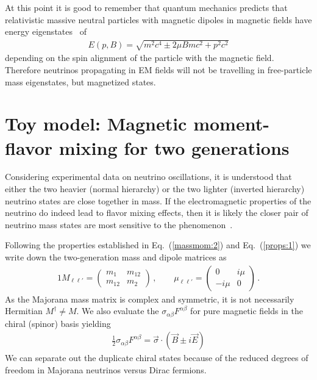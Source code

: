 \documentclass[addchapnum]{ws-rv961x669} %
\newcommand{\req}[1]{Eq.~(\ref{#1})}
\begin{document}
At this point it is good to remember that quantum mechanics predicts that relativistic massive neutral particles with magnetic dipoles in magnetic fields have energy eigenstates~\cite{Steinmetz:2018ryf} of
\begin{align}
    \label{kgp:1}
    E(p,B) = \sqrt{m^{2}c^{4}\pm2\mu Bmc^{2}+p^{2}c^{2}}
\end{align}
depending on the spin alignment of the particle with the magnetic field. Therefore neutrinos propagating in EM fields will not be travelling in free-particle mass eigenstates, but magnetized states.

\section{Toy model: Magnetic moment-flavor mixing for two generations}
\label{sec:mix}
Considering experimental data on neutrino oscillations, it is understood that either the two heavier (normal hierarchy) or the two lighter (inverted hierarchy) neutrino states are close together in mass. If the electromagnetic properties of the neutrino do indeed lead to flavor mixing effects, then it is likely the closer pair of neutrino mass states are most sensitive to the phenomenon~\cite{Bethe:1986ej}. 

Following the properties established in \req{massmom:2} and \req{props:1} we write down the two-generation mass and dipole matrices as
\begin{alignat}{1}
	\label{mix:1} M_{\ell\ell'}= 
	\begin{pmatrix}
		m_{1} & m_{12}\\
		m_{12} & m_{2}
	\end{pmatrix}\,,\qquad
	\mu_{\ell\ell'} = 
	\begin{pmatrix}
		0 & i\mu\\
		-i\mu & 0
	\end{pmatrix}\,.
\end{alignat}
As the Majorana mass matrix is complex and symmetric, it is not necessarily Hermitian $M^{\dag}\neq M$. We also evaluate the $\sigma_{\alpha\beta}F^{\alpha\beta}$ for pure magnetic fields in the chiral (spinor) basis yielding
\begin{align}
    \label{chiral:1}
    \frac{1}{2}\sigma_{\alpha\beta}F^{\alpha\beta}=\vec{\sigma}\cdot(\vec{B}\pm i\vec{E})
\end{align}
We can separate out the duplicate chiral states because of the reduced degrees of freedom in Majorana neutrinos versus Dirac fermions.
\end{document}
